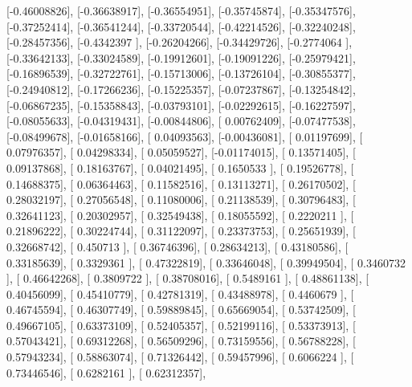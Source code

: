 \documentclass{article}
\begin{document}
       [-0.46008826],
       [-0.36638917],
       [-0.36554951],
       [-0.35745874],
       [-0.35347576],
       [-0.37252414],
       [-0.36541244],
       [-0.33720544],
       [-0.42214526],
       [-0.32240248],
       [-0.28457356],
       [-0.4342397 ],
       [-0.26204266],
       [-0.34429726],
       [-0.2774064 ],
       [-0.33642133],
       [-0.33024589],
       [-0.19912601],
       [-0.19091226],
       [-0.25979421],
       [-0.16896539],
       [-0.32722761],
       [-0.15713006],
       [-0.13726104],
       [-0.30855377],
       [-0.24940812],
       [-0.17266236],
       [-0.15225357],
       [-0.07237867],
       [-0.13254842],
       [-0.06867235],
       [-0.15358843],
       [-0.03793101],
       [-0.02292615],
       [-0.16227597],
       [-0.08055633],
       [-0.04319431],
       [-0.00844806],
       [ 0.00762409],
       [-0.07477538],
       [-0.08499678],
       [-0.01658166],
       [ 0.04093563],
       [-0.00436081],
       [ 0.01197699],
       [ 0.07976357],
       [ 0.04298334],
       [ 0.05059527],
       [-0.01174015],
       [ 0.13571405],
       [ 0.09137868],
       [ 0.18163767],
       [ 0.04021495],
       [ 0.1650533 ],
       [ 0.19526778],
       [ 0.14688375],
       [ 0.06364463],
       [ 0.11582516],
       [ 0.13113271],
       [ 0.26170502],
       [ 0.28032197],
       [ 0.27056548],
       [ 0.11080006],
       [ 0.21138539],
       [ 0.30796483],
       [ 0.32641123],
       [ 0.20302957],
       [ 0.32549438],
       [ 0.18055592],
       [ 0.2220211 ],
       [ 0.21896222],
       [ 0.30224744],
       [ 0.31122097],
       [ 0.23373753],
       [ 0.25651939],
       [ 0.32668742],
       [ 0.450713  ],
       [ 0.36746396],
       [ 0.28634213],
       [ 0.43180586],
       [ 0.33185639],
       [ 0.3329361 ],
       [ 0.47322819],
       [ 0.33646048],
       [ 0.39949504],
       [ 0.3460732 ],
       [ 0.46642268],
       [ 0.3809722 ],
       [ 0.38708016],
       [ 0.5489161 ],
       [ 0.48861138],
       [ 0.40456099],
       [ 0.45410779],
       [ 0.42781319],
       [ 0.43488978],
       [ 0.4460679 ],
       [ 0.46745594],
       [ 0.46307749],
       [ 0.59889845],
       [ 0.65669054],
       [ 0.53742509],
       [ 0.49667105],
       [ 0.63373109],
       [ 0.52405357],
       [ 0.52199116],
       [ 0.53373913],
       [ 0.57043421],
       [ 0.69312268],
       [ 0.56509296],
       [ 0.73159556],
       [ 0.56788228],
       [ 0.57943234],
       [ 0.58863074],
       [ 0.71326442],
       [ 0.59457996],
       [ 0.6066224 ],
       [ 0.73446546],
       [ 0.6282161 ],
       [ 0.62312357],
\end{document}
